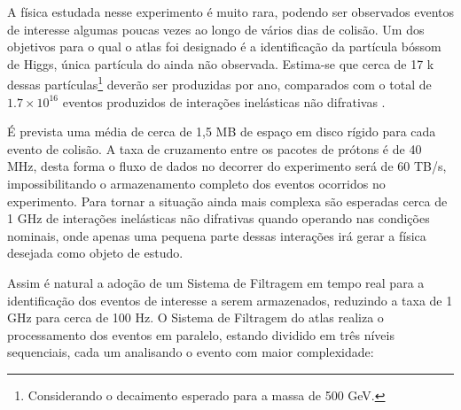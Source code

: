 A física estudada nesse experimento é muito rara, podendo ser observados eventos
de interesse algumas poucas vezes ao longo de vários dias de colisão. 
Um dos objetivos para o qual o \gls{atlas} foi 
designado é a identificação da partícula bóssom de Higgs, única partícula 
do  ainda não observada. Estima-se que cerca de 17 k dessas
partículas\footnote{Considerando o decaimento esperado para a massa de 500 GeV.} deverão ser produzidas por ano, comparados
com o total de $1.7\times10^{16}$ eventos produzidos de interações inelásticas
não difrativas \cite{resumo_ATLAS}. 


É prevista uma média de cerca de 1,5 MB de espaço em disco rígido para cada evento de 
colisão. A taxa de cruzamento entre os pacotes de prótons é de 40 MHz, 
desta forma o fluxo de dados no decorrer do experimento será de 60 TB/s, impossibilitando o
armazenamento completo dos eventos ocorridos no experimento. Para tornar a
situação ainda mais complexa são esperadas cerca de 1 GHz de interações
inelásticas não difrativas \cite{resumo_ATLAS} quando operando nas condições nominais, onde apenas
uma pequena parte dessas interações irá gerar a física desejada como objeto de
estudo.

Assim é natural a adoção de um Sistema de Filtragem em tempo real para a
identificação dos eventos de interesse a serem armazenados, reduzindo a taxa de 1 GHz
para cerca de 100 Hz. O Sistema de Filtragem do \gls{atlas} realiza o processamento dos 
eventos em paralelo, estando dividido em três níveis sequenciais, cada um 
analisando o evento com maior complexidade:


